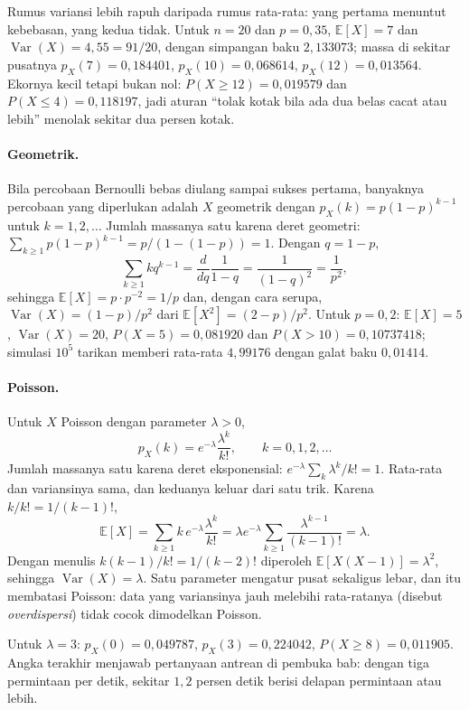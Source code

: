 Rumus variansi lebih rapuh daripada rumus rata-rata: yang pertama menuntut kebebasan,
yang kedua tidak. Untuk $n=20$ dan $p=0{,}35$, $\mathbb{E}[X]=7$ dan
$\operatorname{Var}(X)=4{,}55=91/20$, dengan simpangan baku $2{,}133073$; massa di
sekitar pusatnya $p_X(7)=0{,}184401$, $p_X(10)=0{,}068614$, $p_X(12)=0{,}013564$.
Ekornya kecil tetapi bukan nol: $P(X\ge12)=0{,}019579$ dan $P(X\le4)=0{,}118197$, jadi
aturan ``tolak kotak bila ada dua belas cacat atau lebih'' menolak sekitar dua persen
kotak.

\paragraph{Geometrik.} Bila percobaan Bernoulli bebas diulang sampai sukses pertama,
banyaknya percobaan yang diperlukan adalah $X$ geometrik dengan
$p_X(k)=p(1-p)^{k-1}$ untuk $k=1,2,\dots$ Jumlah massanya satu karena deret geometri:
$\sum_{k\ge1}p(1-p)^{k-1}=p/(1-(1-p))=1$. Dengan $q=1-p$,
\[
\sum_{k\ge1}kq^{k-1}=\frac{d}{dq}\frac{1}{1-q}=\frac{1}{(1-q)^2}=\frac{1}{p^2},
\]
sehingga $\mathbb{E}[X]=p\cdot p^{-2}=1/p$ dan, dengan cara serupa,
$\operatorname{Var}(X)=(1-p)/p^2$ dari $\mathbb{E}[X^2]=(2-p)/p^2$. Untuk $p=0{,}2$:
$\mathbb{E}[X]=5$, $\operatorname{Var}(X)=20$, $P(X=5)=0{,}081920$ dan
$P(X>10)=0{,}10737418$; simulasi $10^5$ tarikan memberi rata-rata $4{,}99176$ dengan
galat baku $0{,}01414$.

\paragraph{Poisson.} Untuk $X$ Poisson dengan parameter $\lambda>0$,
\[
p_X(k)=e^{-\lambda}\frac{\lambda^k}{k!},\qquad k=0,1,2,\dots
\]
Jumlah massanya satu karena deret eksponensial:
$e^{-\lambda}\sum_k\lambda^k/k!=1$. Rata-rata dan variansinya sama, dan keduanya
keluar dari satu trik. Karena $k/k!=1/(k-1)!$,
\[
\mathbb{E}[X]=\sum_{k\ge1}k\,e^{-\lambda}\frac{\lambda^k}{k!}
=\lambda e^{-\lambda}\sum_{k\ge1}\frac{\lambda^{k-1}}{(k-1)!}=\lambda .
\]
Dengan menulis $k(k-1)/k!=1/(k-2)!$ diperoleh $\mathbb{E}[X(X-1)]=\lambda^2$, sehingga
$\operatorname{Var}(X)=\lambda$. Satu parameter mengatur pusat sekaligus lebar, dan itu
membatasi Poisson: data yang variansinya jauh melebihi rata-ratanya (disebut
\emph{overdispersi}) tidak cocok dimodelkan Poisson.

Untuk $\lambda=3$: $p_X(0)=0{,}049787$, $p_X(3)=0{,}224042$,
$P(X\ge8)=0{,}011905$. Angka terakhir menjawab pertanyaan antrean di pembuka bab:
dengan tiga permintaan per detik, sekitar $1{,}2$ persen detik berisi delapan
permintaan atau lebih.

